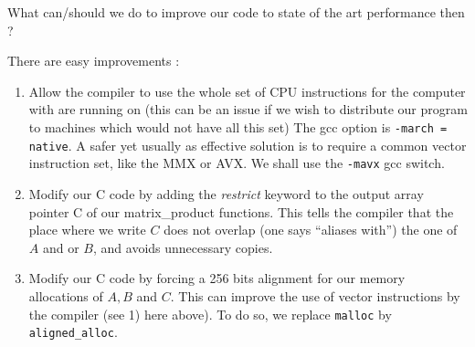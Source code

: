 \documentclass[12pt]{article}
\theoremstyle{plain}
\theoremstyle{remark}
\begin{document}
What can/should we do to improve our code to state of the art performance then ?

There are easy improvements :
\begin{enumerate}
\item Allow the compiler to use the whole set of CPU instructions for the computer
with are running on (this can be an issue if we wish to distribute our program to
machines which would not have all this set) The gcc option is {\tt -march =
native}. A safer yet usually as effective solution is to require a common vector
instruction set, like the MMX or AVX. We shall use the {\tt -mavx} gcc switch.
\item Modify our C code by adding the {\it restrict} keyword to the output array
pointer C of our matrix\_product functions. This tells the compiler that the place where
we write $C$ does not overlap (one says ``aliases with'') the one of $A$ and or
$B$, and avoids unnecessary copies. 
\item Modify our C code by forcing a 256 bits alignment for our
memory allocations of $A, B$ and $C$. This can improve the use of vector
instructions by the compiler (see 1) here above). To do so, we replace 
{\tt malloc} by {\tt aligned\_alloc}.
\end{enumerate}
\end{document}
